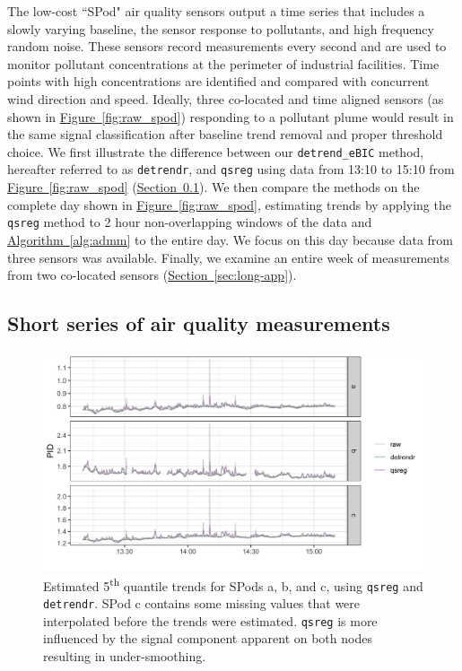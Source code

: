 \documentclass[aoas]{imsart}
\newcommand{\Sec}[1]{\hyperref[sec:#1]{Section~\ref*{sec:#1}}} %
\newcommand{\Fig}[1]{\hyperref[fig:#1]{Figure~\ref*{fig:#1}}} %
\newcommand{\Alg}[1]{\hyperref[alg:#1]{Algorithm~\ref*{alg:#1}}} %
\newcommand{\Sec}[1]{{Section~\ref{sec:#1}}} %
\newcommand{\Fig}[1]{{Figure~\ref{fig:#1}}} %
\newcommand{\Alg}[1]{{Algorithm~\ref{alg:#1}}} %
\begin{document}
\label{sec:application}
The low-cost ``SPod" air quality sensors output a time series that includes a slowly varying baseline,
the sensor response to pollutants, and high frequency random noise. These sensors record measurements every second and are used to monitor pollutant concentrations at the perimeter of industrial facilities. Time points with high concentrations are identified and compared with concurrent wind direction and speed. Ideally, three co-located and time aligned sensors (as shown in \Fig{raw_spod}) responding to a pollutant plume would result in the same signal classification after baseline trend removal and proper threshold choice. We first illustrate the difference between our \texttt{detrend\_eBIC} method,  hereafter referred to as \texttt{detrendr}, and \texttt{qsreg} using data from 13:10 to 15:10 from \Fig{raw_spod} (\Sec{short-app}). We then compare the methods on the complete day shown in \Fig{raw_spod}, estimating trends by applying the \texttt{qsreg} method to 2 hour non-overlapping windows of the data and \Alg{admm} to the entire day. We focus on this day because data from three sensors was available. Finally, we examine an entire week of measurements from two co-located sensors (\Sec{long-app}). 

\subsection{Short series of air quality measurements}
\label{sec:short-app}
\begin{figure}
	\includegraphics[width = \linewidth]{Figures/short_trends.png}
	\caption{Estimated 5\textsuperscript{th} quantile trends for SPods a, b, and c, using \texttt{qsreg} and \texttt{detrendr}. SPod c contains some missing values that were interpolated before the trends were estimated. \texttt{qsreg} is more influenced by the signal component apparent on both nodes resulting in under-smoothing.}
	\label{fig:short-trends}
\end{figure}
\end{document}
